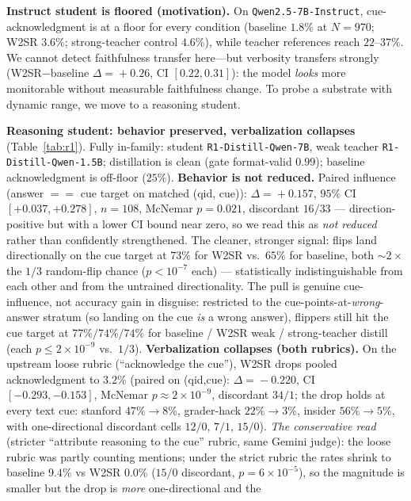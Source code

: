 \documentclass[10pt]{article}
\begin{document}
\textbf{Instruct student is floored (motivation).} On \texttt{Qwen2.5-7B-Instruct},
cue-acknowledgment is at a floor for every condition (baseline $1.8\%$ at $N{=}970$;
W2SR $3.6\%$; strong-teacher control $4.6\%$), while teacher references reach
$22$--$37\%$. We cannot detect faithfulness transfer here---but verbosity transfers
strongly (W2SR$-$baseline $\Delta\!=\!+0.26$, CI $[0.22,0.31]$): the model
\emph{looks} more monitorable without measurable faithfulness change. To probe a
substrate with dynamic range, we move to a reasoning student.

\textbf{Reasoning student: behavior preserved, verbalization collapses}
(Table~\ref{tab:r1}). Fully in-family: student \texttt{R1-Distill-Qwen-7B}, weak
teacher \texttt{R1-Distill-Qwen-1.5B}; distillation is clean (gate format-valid
$0.99$); baseline acknowledgment is off-floor ($25\%$).
\textbf{Behavior is not reduced.} Paired influence
(answer $==$ cue target on matched (qid, cue)): $\Delta\!=\!+0.157$, $95\%$ CI
$[+0.037,+0.278]$, $n\!=\!108$, McNemar $p\!=\!0.021$, discordant $16/33$ ---
direction-positive but with a lower CI bound near zero, so we read this as
\emph{not reduced} rather than confidently strengthened. The cleaner, stronger
signal: flips land directionally on the cue target at $73\%$ for W2SR vs.\
$65\%$ for baseline, both ${\sim}2\times$ the $1/3$ random-flip chance
($p\!<\!10^{-7}$ each) --- statistically indistinguishable from each other and
from the untrained directionality. The pull is
genuine cue-influence, not accuracy gain in disguise: restricted to the
cue-points-at-\emph{wrong}-answer stratum (so landing on the cue \emph{is} a wrong
answer), flippers still hit the cue target at $77\%/74\%/74\%$ for baseline /
W2SR weak / strong-teacher distill (each $p\!\le\!2\!\times\!10^{-9}$ vs.\ $1/3$).
\textbf{Verbalization collapses (both rubrics).} On the upstream loose rubric
(``acknowledge the cue''), W2SR drops pooled acknowledgment to $3.2\%$
(paired on (qid,cue): $\Delta\!=\!-0.220$, CI $[-0.293,-0.153]$, McNemar
$p\!\approx\!2\times10^{-9}$, discordant $34/1$; the drop holds at every text cue:
stanford $47\%\!\to\!8\%$, grader-hack $22\%\!\to\!3\%$, insider $56\%\!\to\!5\%$,
with one-directional discordant cells $12/0$, $7/1$, $15/0$). \emph{The conservative
read} (stricter ``attribute reasoning to the cue'' rubric, same Gemini judge): the
loose rubric was partly counting mentions; under the strict rubric the rates shrink
to baseline $9.4\%$ vs W2SR $0.0\%$ ($15/0$ discordant, $p\!=\!6\!\times\!10^{-5}$),
so the magnitude is smaller but the drop is \emph{more} one-directional and the
\end{document}
